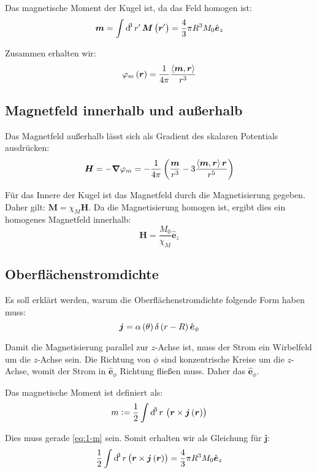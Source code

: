 \documentclass[11pt, ngerman, fleqn]{article}
\newcommand{\ev}{\hat{\vec e}}
\newcommand{\half}{\frac 12}
\newcommand{\inner}[2]{\left\langle #1, #2 \right\rangle}
\newcommand{\vnabla}{\vec \nabla}
\renewcommand{\vec}[1]{\boldsymbol{#1}}
\begin{document}
Das magnetische Moment der Kugel ist, da das Feld homogen ist:
\begin{equation}
	\label{eq:1-m}
	\vec m = \int \dif^3 r' \, \vec M \del{\vec r'} = \frac 43 \pi R^3 M_0 \ev_z
\end{equation}

Zusammen erhalten wir:
\[
	\varphi_m \del{\vec r}
	= \frac{1}{4\pi} \frac{\inner{\vec m}{\vec r}}{r^3}
\]

\subsection{Magnetfeld innerhalb und außerhalb}

Das Magnetfeld außerhalb lässt sich als Gradient des skalaren Potentials
ausdrücken:
\[
	\vec H
	= - \vnabla \varphi_m
	= - \frac{1}{4 \pi} \del{\frac{\vec m}{r^3} - 3 \frac{\inner{\vec m}{\vec r} \vec r}{r^5}}
\]

Für das Innere der Kugel ist das Magnetfeld durch die Magnetisierung gegeben. Daher gilt: $\vec M = \chi_M \vec H$. Da die Magnetisierung homogen ist, ergibt dies ein homogenes Magnetfeld innerhalb:
\[
	\vec H = \frac{M_0}{\chi_M} \ev_z
\]

\subsection{Oberflächenstromdichte}

Es soll erklärt werden, warum die Oberflächenstromdichte folgende Form haben
muss:
\[
	\vec j = \alpha\del\theta \delta\del{r-R} \ev_\phi
\]

Damit die Magnetisierung parallel zur $z$-Achse ist, muss der Strom ein
Wirbelfeld um die $z$-Achse sein. Die Richtung von $\phi$ sind konzentrische
Kreise um die $z$-Achse, womit der Strom in $\ev_\phi$ Richtung fließen
muss. Daher das $\ev_\phi$.

Das magnetische Moment ist definiert als:
\[
	m := \half \int \dif^3 r \, \del{\vec r \times \vec j\del{\vec r}}
\]

Dies muss gerade \eqref{eq:1-m} sein. Somit erhalten wir als Gleichung für
$\vec j$:
\[
	\half \int \dif^3 r \del{\vec r \times \vec j\del{\vec r}}
	= \frac 43 \pi R^3 M_0 \ev_z
\]
\end{document}
